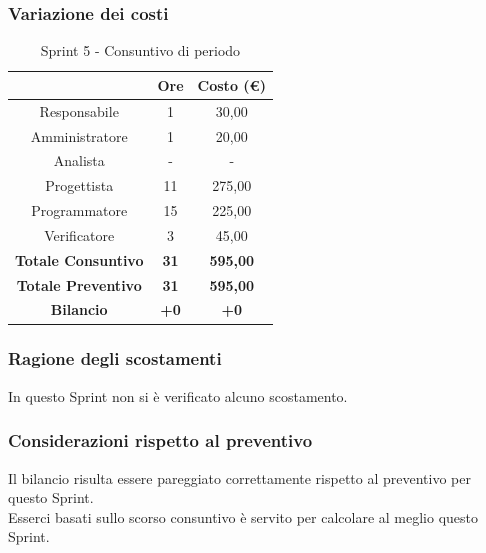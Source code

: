 \subsubsection{Variazione dei costi} \label{subsubsection:variazione_costi_sprint5}

\begin{table}[H]
  \centering
  \renewcommand{\arraystretch}{1.8}
  \begin{tabular}{c|c|c}
    \rowcolor[HTML]{125E28}
    \multicolumn{1}{c}{\color[HTML]{FFFFFF}\textbf{Ruolo}} &
    \multicolumn{1}{c}{\color[HTML]{FFFFFF}\textbf{Ore}}   &
    \multicolumn{1}{c}{\color[HTML]{FFFFFF}\textbf{Costo (€)}}                             \\
    \hline
    Responsabile                                           & 1           & 30,00           \\
    Amministratore                                         & 1           & 20,00           \\
    Analista                                               & -           & -               \\
    Progettista                                            & 11          & 275,00          \\
    Programmatore                                          & 15          & 225,00          \\
    Verificatore                                           & 3           & 45,00           \\
    \textbf{Totale Consuntivo}                             & \textbf{31} & \textbf{595,00} \\
    \textbf{Totale Preventivo}                             & \textbf{31} & \textbf{595,00} \\
    \textbf{Bilancio}                                      & \textbf{+0} & \textbf{+0}     \\
  \end{tabular}
  \caption{Sprint 5 - Consuntivo di periodo}
\end{table}

\subsubsection{Ragione degli scostamenti} \label{subsubsection:ragione_scostamenti_sprint5}
In questo Sprint\glo{} non si è verificato alcuno scostamento.

\subsubsection{Considerazioni rispetto al preventivo} \label{subsubsection:considerazioni_finali_sprint5}
Il bilancio risulta essere pareggiato correttamente rispetto al preventivo per questo Sprint\glo{}.
\\Esserci basati sullo scorso consuntivo è servito per calcolare al meglio questo Sprint\glo{}.

